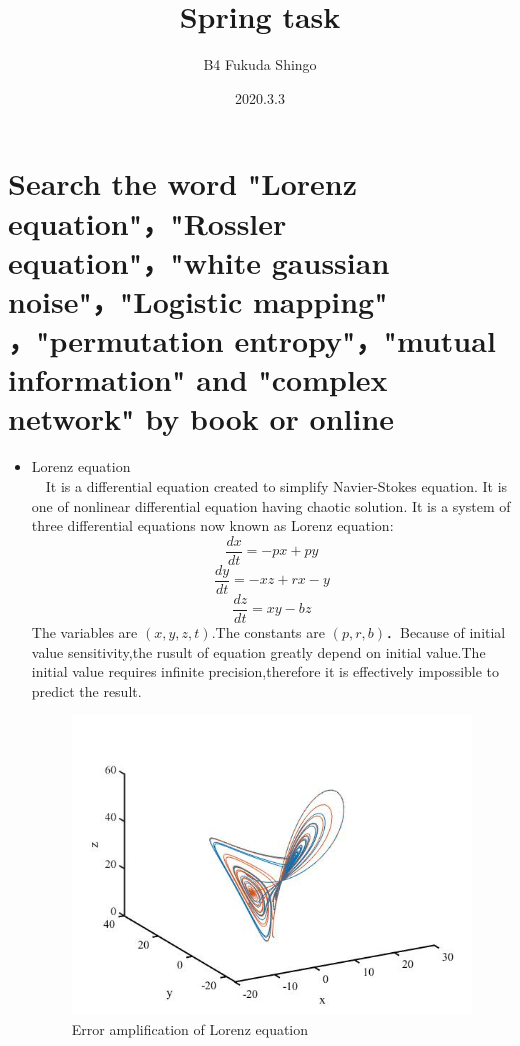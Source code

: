 \documentclass[autodetect-engine,dvipdfmx-if-dvi,ja=standard,a4paper,11pt]{bxjsarticle} %
\title{Spring task} %
\author{B4 Fukuda Shingo} %
\date{2020.3.3}%
\begin{document}
\maketitle %
\section{\normalsize Search the word "Lorenz equation"，"Rossler equation"，"white gaussian noise"，"Logistic mapping"
，"permutation entropy"，"mutual information" and "complex network" by book or online
}%


\begin{itemize}
\item Lorenz equation\\%
　It is a differential equation created to simplify Navier-Stokes equation. It is one of nonlinear differential equation having chaotic solution. It is a system of three differential equations now known as Lorenz equation:\cite{lo}
\begin{equation}
\frac{dx}{dt}=-px+py
\end{equation}
\begin{equation}
\frac{dy}{dt}=-xz+rx-y
\end{equation}
\begin{equation}
\frac{dz}{dt}=xy-bz
\end{equation}
The variables are $(x,y,z,t)$.The constants are $(p,r,b)$．Because of initial value sensitivity,the rusult of equation greatly depend on initial value.The initial value requires infinite precision,therefore it is effectively impossible to predict the result.

\begin{figure}[H]%
\begin{center}

\includegraphics[width=.4\textwidth]{Lorenz_result.jpg}
\end{center}
\caption{Error amplification of Lorenz equation}%
\label{fig:lorenz}
\end{figure}


\end{itemize}
\end{document}

